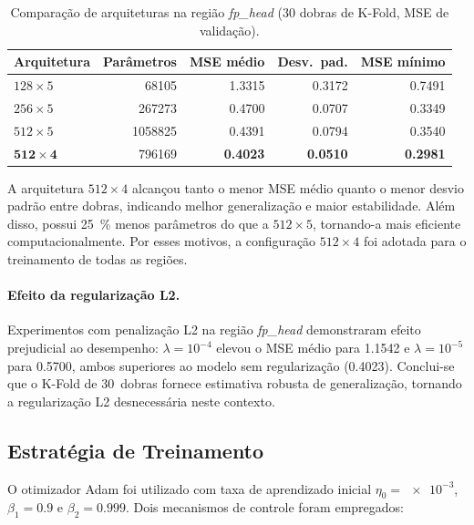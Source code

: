 \documentclass[12pt, a4paper]{article}
\begin{document}
\begin{table}[htb]
\centering
\caption{%
  Comparação de arquiteturas na região \textit{fp\_head}
  (30 dobras de K-Fold, MSE de validação).
}
\label{tab:arquiteturas}
\begin{tabular}{@{}lrrrr@{}}
\toprule
\textbf{Arquitetura} & \textbf{Parâmetros} &
  \textbf{MSE médio} & \textbf{Desv.\ pad.} & \textbf{MSE mínimo} \\
\midrule
$128 \times 5$ & \num{68105}   & \num{1,3315} & \num{0,3172} & \num{0,7491} \\
$256 \times 5$ & \num{267273}  & \num{0,4700} & \num{0,0707} & \num{0,3349} \\
$512 \times 5$ & \num{1058825} & \num{0,4391} & \num{0,0794} & \num{0,3540} \\
$\bm{512 \times 4}$ & \num{796169} & \textbf{\num{0,4023}} & \textbf{\num{0,0510}} & \textbf{\num{0,2981}} \\
\bottomrule
\end{tabular}
\end{table}

A arquitetura $512 \times 4$ alcançou tanto o menor MSE médio quanto o menor
desvio padrão entre dobras, indicando melhor generalização e maior
estabilidade. Além disso, possui \SI{25}{\percent} menos parâmetros do que a
$512 \times 5$, tornando-a mais eficiente computacionalmente.
Por esses motivos, a configuração $512 \times 4$ foi adotada para o
treinamento de todas as regiões.

\paragraph{Efeito da regularização L2.}
Experimentos com penalização L2 na região \textit{fp\_head} demonstraram
efeito prejudicial ao desempenho: $\lambda = 10^{-4}$ elevou o MSE médio para
\num{1,1542} e $\lambda = 10^{-5}$ para \num{0,5700}, ambos superiores ao
modelo sem regularização (\num{0,4023}). Conclui-se que o K-Fold de 30~dobras
fornece estimativa robusta de generalização, tornando a regularização L2
desnecessária neste contexto.

\subsection{Estratégia de Treinamento}
\label{sec:treinamento}

O otimizador Adam foi utilizado com taxa de aprendizado inicial
$\eta_0 = \num{e-3}$, $\beta_1 = \num{0,9}$ e $\beta_2 = \num{0,999}$.
Dois mecanismos de controle foram empregados:
\end{document}

